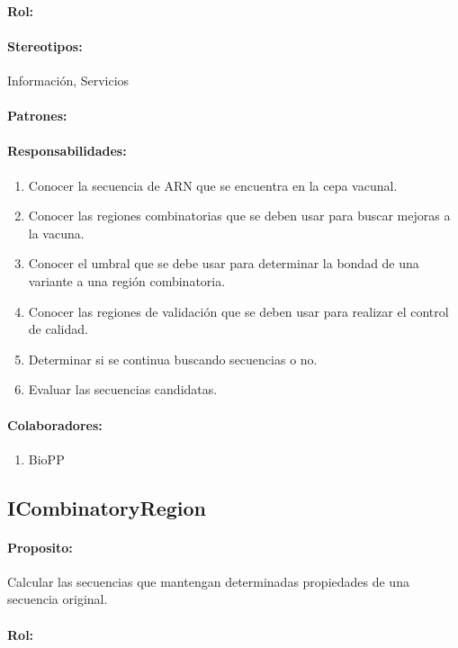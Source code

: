 \documentclass[a4paper,10pt]{article}
\begin{document}
    \paragraph{Rol:}
    \paragraph{Stereotipos:} Informaci\'on, Servicios
    \paragraph{Patrones:}
    \paragraph{Responsabilidades:}
      \begin{enumerate}
       \item Conocer la secuencia de ARN que se encuentra en la cepa vacunal.
       \item Conocer las regiones combinatorias que se deben usar para buscar
mejoras a la vacuna.
       \item Conocer el umbral que se debe usar para determinar la bondad de una
variante a una regi\'on combinatoria.
       \item Conocer las regiones de validaci\'on que se deben usar para
realizar el control de calidad.
       \item Determinar si se continua buscando secuencias o no.
       \item Evaluar las secuencias candidatas.
      \end{enumerate}
    \paragraph{Colaboradores:}
      \begin{enumerate}
       \item BioPP
      \end{enumerate}

  \subsection{ICombinatoryRegion}
    \paragraph{Proposito:} Calcular las secuencias que mantengan
determinadas propiedades de una secuencia original.
    \paragraph{Rol:}
\end{document}
